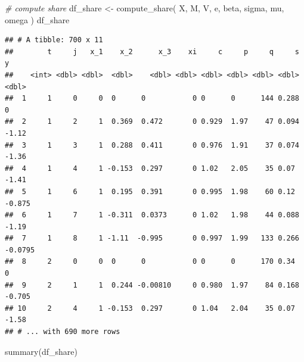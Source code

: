 \documentclass[
]{book}
\newenvironment{Shaded}{\begin{snugshade}}{\end{snugshade}}
\newcommand{\CommentTok}[1]{\textcolor[rgb]{0.56,0.35,0.01}{\textit{#1}}}
\newcommand{\FunctionTok}[1]{\textcolor[rgb]{0.00,0.00,0.00}{#1}}
\newcommand{\NormalTok}[1]{#1}
\newcommand{\OtherTok}[1]{\textcolor[rgb]{0.56,0.35,0.01}{#1}}
\begin{document}
\begin{Shaded}
\begin{Highlighting}[]
\CommentTok{\# compute share}
\NormalTok{df\_share }\OtherTok{\textless{}{-}}
  \FunctionTok{compute\_share}\NormalTok{(}
\NormalTok{    X, }
\NormalTok{    M, }
\NormalTok{    V, }
\NormalTok{    e, }
\NormalTok{    beta, }
\NormalTok{    sigma, }
\NormalTok{    mu, }
\NormalTok{    omega}
\NormalTok{    )}
\NormalTok{df\_share}
\end{Highlighting}
\end{Shaded}

\begin{verbatim}
## # A tibble: 700 x 11
##        t     j   x_1    x_2      x_3    xi     c     p     q     s       y
##    <int> <dbl> <dbl>  <dbl>    <dbl> <dbl> <dbl> <dbl> <dbl> <dbl>   <dbl>
##  1     1     0     0  0      0           0 0      0      144 0.288  0     
##  2     1     2     1  0.369  0.472       0 0.929  1.97    47 0.094 -1.12  
##  3     1     3     1  0.288  0.411       0 0.976  1.91    37 0.074 -1.36  
##  4     1     4     1 -0.153  0.297       0 1.02   2.05    35 0.07  -1.41  
##  5     1     6     1  0.195  0.391       0 0.995  1.98    60 0.12  -0.875 
##  6     1     7     1 -0.311  0.0373      0 1.02   1.98    44 0.088 -1.19  
##  7     1     8     1 -1.11  -0.995       0 0.997  1.99   133 0.266 -0.0795
##  8     2     0     0  0      0           0 0      0      170 0.34   0     
##  9     2     1     1  0.244 -0.00810     0 0.980  1.97    84 0.168 -0.705 
## 10     2     4     1 -0.153  0.297       0 1.04   2.04    35 0.07  -1.58  
## # ... with 690 more rows
\end{verbatim}

\begin{Shaded}
\begin{Highlighting}[]
\FunctionTok{summary}\NormalTok{(df\_share)}
\end{Highlighting}
\end{Shaded}
\end{document}
